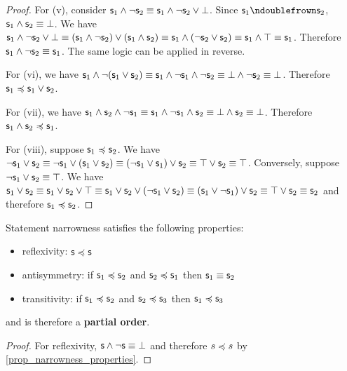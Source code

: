 \documentclass[11pt,letterpaper,fleqn]{memoir} %
\begin{document}
\begin{mathSection}
\begin{proof}
	For (v), consider $\mathsf{s}_1 \wedge \neg \mathsf{s}_2 \equiv \mathsf{s}_1 \wedge \neg \mathsf{s}_2 \vee \bot$. Since $\stmt_1 \ncomp \stmt_2$, $\mathsf{s}_1 \wedge \mathsf{s}_2 \equiv \bot$. We have $\mathsf{s}_1 \wedge \neg \mathsf{s}_2 \vee \bot \equiv ( \mathsf{s}_1 \wedge \neg \mathsf{s}_2 ) \vee (\mathsf{s}_1 \wedge \mathsf{s}_2) \equiv \mathsf{s}_1 \wedge (\neg \mathsf{s}_2 \vee \mathsf{s}_2) \equiv \mathsf{s}_1 \wedge \top \equiv \mathsf{s}_1$. Therefore $\mathsf{s}_1 \wedge \neg \mathsf{s}_2 \equiv \mathsf{s}_1$. The same logic can be applied in reverse.
	
	For (vi), we have $\mathsf{s}_1 \wedge \neg (\mathsf{s}_1 \vee \mathsf{s}_2) \equiv \mathsf{s}_1 \wedge \neg \mathsf{s}_1 \wedge \neg \mathsf{s}_2 \equiv \bot \wedge \neg \mathsf{s}_2 \equiv \bot$. Therefore $\mathsf{s}_1 \preccurlyeq \mathsf{s}_1 \vee \mathsf{s}_2$.
	
	For (vii), we have $\mathsf{s}_1 \wedge \mathsf{s}_2 \wedge \neg \mathsf{s}_1 \equiv \mathsf{s}_1 \wedge \neg \mathsf{s}_1 \wedge \mathsf{s}_2 \equiv \bot \wedge \mathsf{s}_2 \equiv \bot$. Therefore $\mathsf{s}_1 \wedge \mathsf{s}_2 \preccurlyeq \mathsf{s}_1$.
	
	For (viii), suppose $\mathsf{s}_1 \preccurlyeq \mathsf{s}_2$. We have $\neg \mathsf{s}_1 \vee \mathsf{s}_2 \equiv \neg \mathsf{s}_1 \vee ( \mathsf{s}_1 \vee \mathsf{s}_2 ) \equiv (\neg \mathsf{s}_1 \vee \mathsf{s}_1) \vee \mathsf{s}_2 \equiv \top \vee \mathsf{s}_2 \equiv \top$. Conversely, suppose $\neg \mathsf{s}_1 \vee \mathsf{s}_2 \equiv \top$. We have $\mathsf{s}_1 \vee \mathsf{s}_2 \equiv \mathsf{s}_1 \vee \mathsf{s}_2 \vee \top \equiv \mathsf{s}_1 \vee \mathsf{s}_2 \vee (\neg \mathsf{s}_1 \vee \mathsf{s}_2) \equiv (\mathsf{s}_1 \vee \neg \mathsf{s}_1) \vee \mathsf{s}_2 \equiv \top \vee \mathsf{s}_2 \equiv \mathsf{s}_2$ and therefore $\mathsf{s}_1 \preccurlyeq \mathsf{s}_2$.
\end{proof}

\begin{prop}
	Statement narrowness satisfies the following properties:
	\begin{itemize}
		\item reflexivity: $\mathsf{s} \preccurlyeq \mathsf{s}$
		\item antisymmetry: if $\mathsf{s}_1 \preccurlyeq \mathsf{s}_2$ and  $\mathsf{s}_2 \preccurlyeq \mathsf{s}_1$ then $\mathsf{s}_1 \equiv \mathsf{s}_2$
		\item transitivity: if $\mathsf{s}_1 \preccurlyeq \mathsf{s}_2$ and $\mathsf{s}_2 \preccurlyeq \mathsf{s}_3$ then $\mathsf{s}_1 \preccurlyeq \mathsf{s}_3$
	\end{itemize}
	and is therefore a \textbf{partial order}.
\end{prop}
\begin{proof}
	For reflexivity, $\mathsf{s} \wedge \neg \mathsf{s} \equiv \bot$ and therefore $s \preccurlyeq s$ by \ref{prop_narrowness_properties}.
	

\end{proof}
\end{mathSection}
\end{document}
